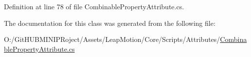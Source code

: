 Definition at line 78 of file Combinable\+Property\+Attribute.\+cs.



The documentation for this class was generated from the following file\+:\begin{DoxyCompactItemize}
\item 
O\+:/\+Git\+H\+U\+B\+M\+I\+N\+I\+P\+Roject/\+Assets/\+Leap\+Motion/\+Core/\+Scripts/\+Attributes/\mbox{\hyperlink{_combinable_property_attribute_8cs}{Combinable\+Property\+Attribute.\+cs}}\end{DoxyCompactItemize}
